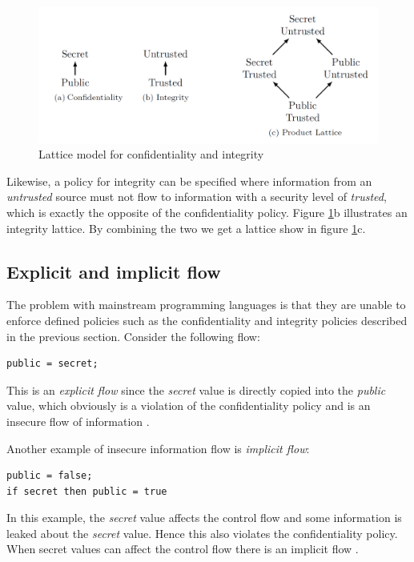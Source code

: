 \begin{figure}[H]
	\centering
	\includegraphics[width=12cm]{figures/lattice.png}
	\caption{ Lattice model for confidentiality and integrity \cite{Musard2014}}
	\label{fig:lattice}
\end{figure}

Likewise, a policy for integrity can be specified where information from an \emph{untrusted} source must not flow to information with a security level of \emph{trusted}, which is exactly the opposite of the confidentiality policy. Figure \ref{fig:lattice}b illustrates an integrity lattice. By combining the two we get a lattice show in figure \ref{fig:lattice}c.

\subsection{Explicit and implicit flow}\label{explicitimplicit}
The problem with mainstream programming languages is that they are unable to enforce defined policies such as the confidentiality and integrity policies described in the previous section. Consider the following flow:

\begin{lstlisting}
public = secret;
\end{lstlisting}

This is an \emph{explicit flow} since the \emph{secret} value is directly copied into the \emph{public} value, which obviously is a violation of the confidentiality policy and is an insecure flow of information \cite{Hedin2011}. 

Another example of insecure information flow is \emph{implicit flow}:

\begin{lstlisting}[language=ALGOL]
public = false;
if secret then public = true
\end{lstlisting}

In this example, the \emph{secret} value affects the control flow and some information is leaked about the \emph{secret} value. Hence this also violates the confidentiality policy. When secret values can affect the control flow there is an implicit flow \cite{Sabelfeld2003}.

